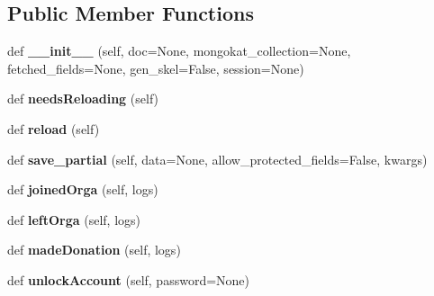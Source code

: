 \subsection*{Public Member Functions}
\begin{DoxyCompactItemize}
\item 
\mbox{\label{classapp_1_1models_1_1user_1_1_user_document_a4a20974b56e803553aa0b04f0b5d18e4}} 
def {\bfseries \+\_\+\+\_\+init\+\_\+\+\_\+} (self, doc=None, mongokat\+\_\+collection=None, fetched\+\_\+fields=None, gen\+\_\+skel=False, session=None)
\item 
\mbox{\label{classapp_1_1models_1_1user_1_1_user_document_a7a02aa33b7a70370658fc06960681740}} 
def {\bfseries needs\+Reloading} (self)
\item 
\mbox{\label{classapp_1_1models_1_1user_1_1_user_document_ab147b0b9bfea557d4cc45f5f85269210}} 
def {\bfseries reload} (self)
\item 
\mbox{\label{classapp_1_1models_1_1user_1_1_user_document_a1d4025f45a02ab236016ec81ce689de5}} 
def {\bfseries save\+\_\+partial} (self, data=None, allow\+\_\+protected\+\_\+fields=False, kwargs)
\item 
\mbox{\label{classapp_1_1models_1_1user_1_1_user_document_a5cbb6254e98e6cd4919be0441bcb385e}} 
def {\bfseries joined\+Orga} (self, logs)
\item 
\mbox{\label{classapp_1_1models_1_1user_1_1_user_document_a0d76b728c71286512f67f1ce8b69c73e}} 
def {\bfseries left\+Orga} (self, logs)
\item 
\mbox{\label{classapp_1_1models_1_1user_1_1_user_document_ab412530928360a56746bfe2f5bc750ca}} 
def {\bfseries made\+Donation} (self, logs)
\item 
\mbox{\label{classapp_1_1models_1_1user_1_1_user_document_abf11dc2dea961788f3de475ef0b93721}} 
def {\bfseries unlock\+Account} (self, password=None)

\end{DoxyCompactItemize}
